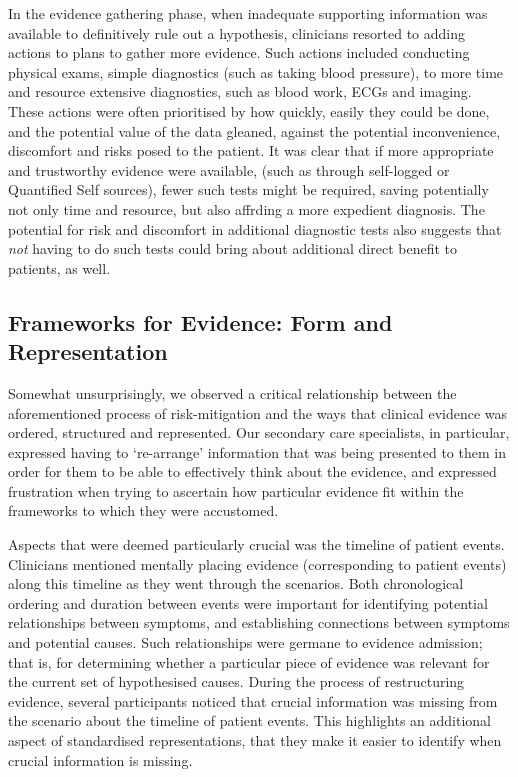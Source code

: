 \documentclass{sigchi}
\begin{document}
In the evidence gathering phase, when inadequate supporting information was available to definitively rule out a hypothesis, clinicians resorted to adding actions to plans to gather more evidence.  Such actions included conducting physical exams, simple diagnostics (such as taking blood pressure), to more time and resource extensive diagnostics, such as blood work, ECGs and imaging.  These actions were often prioritised by how quickly, easily they could be done, and the potential value of the data gleaned, against the potential inconvenience, discomfort and risks posed to the patient.  It was clear that if more appropriate and trustworthy evidence were available, (such as through self-logged or Quantified Self sources), fewer such tests might be required, saving potentially not only time and resource, but also affrding a more expedient diagnosis.  The potential for risk and discomfort in additional diagnostic tests also suggests that \emph{not} having to do such tests could bring about additional direct benefit to patients, as well. 

\subsection{Frameworks for Evidence: Form and Representation}

Somewhat unsurprisingly, we observed a critical relationship between the aforementioned process of risk-mitigation and the ways that clinical evidence was ordered, structured and represented. Our  secondary care specialists, in particular, expressed having to `re-arrange' information that was being presented to them in order for them to be able to effectively think about the evidence, and expressed frustration when trying to ascertain how particular evidence fit within the frameworks to which they were accustomed.

Aspects that were deemed particularly crucial was the timeline of patient events.  Clinicians mentioned mentally placing evidence (corresponding to patient events) along this timeline as they went through the scenarios. Both chronological ordering and duration between events were important for identifying potential relationships between symptoms, and establishing connections between symptoms and potential causes.   Such relationships were germane to evidence admission; that is, for determining whether a particular piece of evidence was relevant for the current set of hypothesised causes. During the process of restructuring evidence, several participants noticed that crucial information was missing from the scenario about the timeline of patient events.  This highlights an additional aspect of standardised representations, that they make it easier to identify when crucial information is missing.
\end{document}
